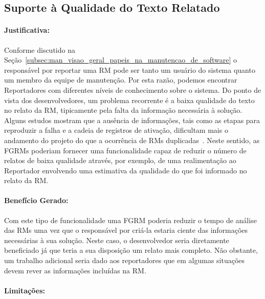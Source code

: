 \subsection{Suporte à Qualidade do Texto Relatado}\label{sub:supote_a_qualidade_do_relato}


\paragraph{Justificativa:}\label{par:justificativa_s01}

Conforme discutido na
Seção~\ref{subsec:man_visao_geral_papeis_na_manutencao_de_software} o
responsável por reportar uma RM pode ser tanto um usuário do sistema quanto um
membro da equipe de manutenção. Por esta razão, podemos encontrar Reportadores
com diferentes níveis de conhecimento sobre o sistema. Do ponto de vista dos
desenvolvedores, um problema recorrente é a baixa qualidade do texto no relato
da RM, tipicamente pela falta da informação necessária à solução. Alguns
estudos mostram que a ausência de informações, tais como as etapas para
reproduzir a falha e a cadeia de registros de ativação, dificultam mais o
andamento do projeto do que a ocorrência de RMs
duplicadas~\cite{zimmermann2010makes, bettenburg2007quality}.  Neste sentido,
as FGRMs poderiam fornecer uma funcionalidade capaz de reduzir o número de
relatos de baixa qualidade através, por exemplo, de uma realimentação ao
Reportador envolvendo uma estimativa da qualidade do que foi informado no
relato da RM\@.

\paragraph{Benefício Gerado:}\label{par:beneficio_s01}

Com este tipo de funcionalidade uma FGRM poderia reduzir o tempo de análise das
RMs uma vez que o responsável por criá-la estaria ciente das informações
necessárias à sua solução. Neste caso, o desenvolvedor seria diretamente
beneficiado já que teria a sua disposição um relato mais completo. Não
obstante, um trabalho adicional seria dado aos reportadores que em algumas
situações devem rever as informações incluídas na RM\@.

\paragraph{Limitações:}\label{par:limitacoes_s01}

